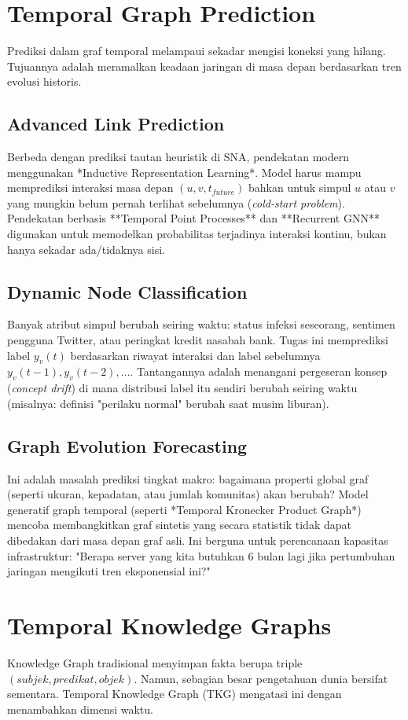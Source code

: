 \documentclass[12pt,a4paper]{book}
\begin{document}
\chapter{Temporal Graph Prediction}
Prediksi dalam graf temporal melampaui sekadar mengisi koneksi yang hilang. Tujuannya adalah meramalkan keadaan jaringan di masa depan berdasarkan tren evolusi historis.

\section{Advanced Link Prediction}
Berbeda dengan prediksi tautan heuristik di SNA, pendekatan modern menggunakan *Inductive Representation Learning*.
Model harus mampu memprediksi interaksi masa depan $(u, v, t_{future})$ bahkan untuk simpul $u$ atau $v$ yang mungkin belum pernah terlihat sebelumnya (\textit{cold-start problem}). Pendekatan berbasis **Temporal Point Processes** dan **Recurrent GNN** digunakan untuk memodelkan probabilitas terjadinya interaksi kontinu, bukan hanya sekadar ada/tidaknya sisi.

\section{Dynamic Node Classification}
Banyak atribut simpul berubah seiring waktu: status infeksi seseorang, sentimen pengguna Twitter, atau peringkat kredit nasabah bank.
Tugas ini memprediksi label $y_v(t)$ berdasarkan riwayat interaksi dan label sebelumnya $y_v(t-1), y_v(t-2), \dots$. Tantangannya adalah menangani pergeseran konsep (\textit{concept drift}) di mana distribusi label itu sendiri berubah seiring waktu (misalnya: definisi "perilaku normal" berubah saat musim liburan).

\section{Graph Evolution Forecasting}
Ini adalah masalah prediksi tingkat makro: bagaimana properti global graf (seperti ukuran, kepadatan, atau jumlah komunitas) akan berubah?
Model generatif graph temporal (seperti *Temporal Kronecker Product Graph*) mencoba membangkitkan graf sintetis yang secara statistik tidak dapat dibedakan dari masa depan graf asli. Ini berguna untuk perencanaan kapasitas infrastruktur: "Berapa server yang kita butuhkan 6 bulan lagi jika pertumbuhan jaringan mengikuti tren eksponensial ini?"

\chapter{Temporal Knowledge Graphs}
Knowledge Graph tradisional menyimpan fakta berupa triple $(subjek, predikat, objek)$. Namun, sebagian besar pengetahuan dunia bersifat sementara. Temporal Knowledge Graph (TKG) mengatasi ini dengan menambahkan dimensi waktu.
\end{document}
